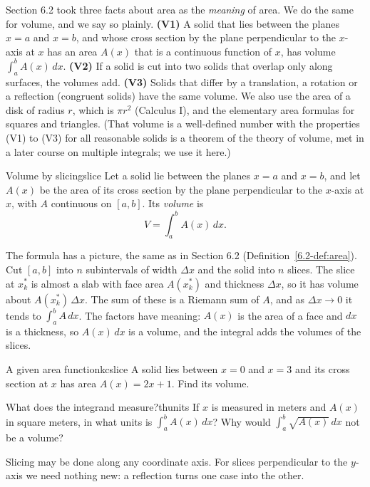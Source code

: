 \documentclass[11pt]{article}
\begin{document}
Section 6.2 took three facts about area as the \emph{meaning} of area. We do the same for volume, and we say so plainly. \textbf{(V1)} A solid that lies between the planes $x=a$ and $x=b$, and whose cross section by the plane perpendicular to the $x$-axis at $x$ has an area $A(x)$ that is a continuous function of $x$, has volume $\int_a^bA(x)\,dx$. \textbf{(V2)} If a solid is cut into two solids that overlap only along surfaces, the volumes add. \textbf{(V3)} Solids that differ by a translation, a rotation or a reflection (congruent solids) have the same volume. We also use the area of a disk of radius $r$, which is $\pi r^2$ (Calculus I), and the elementary area formulas for squares and triangles. (That volume is a well-defined number with the properties (V1) to (V3) for all reasonable solids is a theorem of the theory of volume, met in a later course on multiple integrals; we use it here.)

\begin{defn}{Volume by slicing}{slice}
Let a solid lie between the planes $x=a$ and $x=b$, and let $A(x)$ be the area of its cross section by the plane perpendicular to the $x$-axis at $x$, with $A$ continuous on $[a,b]$. Its \emph{volume} is
\[
V=\int_a^bA(x)\,dx .
\]
\end{defn}

The formula has a picture, the same as in Section 6.2 (Definition~\ref{6.2-def:area}). Cut $[a,b]$ into $n$ subintervals of width $\Delta x$ and the solid into $n$ slices. The slice at $x_k^*$ is almost a slab with face area $A(x_k^*)$ and thickness $\Delta x$, so it has volume about $A(x_k^*)\,\Delta x$. The sum of these is a Riemann sum of $A$, and as $\Delta x\to0$ it tends to $\int_a^bA\,dx$. The factors have meaning: $A(x)$ is the area of a face and $dx$ is a thickness, so $A(x)\,dx$ is a volume, and the integral adds the volumes of the slices.

\begin{kc}{A given area function}{kcslice}
A solid lies between $x=0$ and $x=3$ and its cross section at $x$ has area $A(x)=2x+1$. Find its volume.
\end{kc}

\begin{think}{What does the integrand measure?}{thunits}
If $x$ is measured in meters and $A(x)$ in square meters, in what units is $\int_a^bA(x)\,dx$? Why would $\int_a^b\sqrt{A(x)}\,dx$ not be a volume?
\end{think}

Slicing may be done along any coordinate axis. For slices perpendicular to the $y$-axis we need nothing new: a reflection turns one case into the other.
\end{document}
